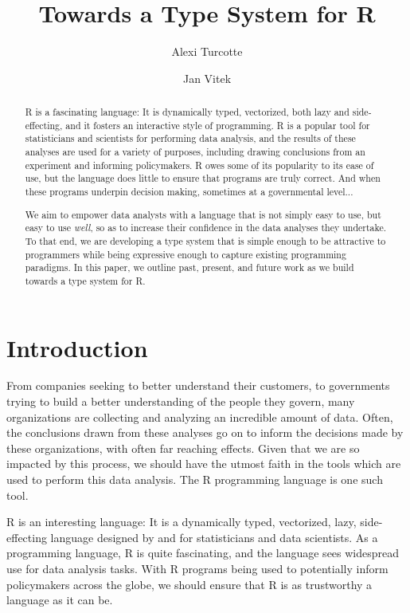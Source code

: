 \documentclass[sigplan,10pt,review]{acmart}\settopmatter{printfolios=true,printccs=false,printacmref=false}
\author{Alexi Turcotte}
\affiliation{
  \institution{Northeastern University}            %
}
\author{Jan Vitek}
\affiliation{
  \institution{Northeastern University}            %
}
\begin{document}
\title{Towards a Type System for R}

\begin{abstract}

R is a fascinating language:
It is dynamically typed, vectorized, both lazy and side-effecting, and it fosters an interactive style of programming.
R is a popular tool for statisticians and scientists for performing data analysis, and the results of these analyses are used for a variety of purposes, including drawing conclusions from an experiment and informing policymakers.
R owes some of its popularity to its ease of use, but the language does little to ensure that programs are truly correct.
And when these programs underpin decision making, sometimes at a governmental level...

We aim to empower data analysts with a language that is not simply easy to use, but easy to use {\it well}, so as to increase their confidence in the data analyses they undertake.
To that end, we are developing a type system that is simple enough to be attractive to programmers while being expressive enough to capture existing programming paradigms.
In this paper, we outline past, present, and future work as we build towards a type system for R. 

\end{abstract}

\maketitle


%
%
%
%
\section{Introduction}

From companies seeking to better understand their customers, to governments trying to build a better understanding of the people they govern, many organizations are collecting and analyzing an incredible amount of data.
Often, the conclusions drawn from these analyses go on to inform the decisions made by these organizations, with often far reaching effects.
Given that we are so impacted by this process, we should have the utmost faith in the tools which are used to perform this data analysis.
The R programming language is one such tool.

R is an interesting language:
It is a dynamically typed, vectorized, lazy, side-effecting language designed by and for statisticians and data scientists.
As a programming language, R is quite fascinating, and the language sees widespread use for data analysis tasks.
With R programs being used to potentially inform policymakers across the globe, we should ensure that R is as trustworthy a language as it can be.
\end{document}

